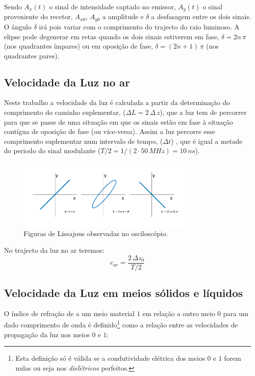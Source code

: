\documentclass[a4paper,12pt]{article}      %
\begin{document}
Sendo $A_x(t)$ o sinal de intensidade captado no emissor,  $A_y(t)$ o sinal
proveniente do recetor, $A_{x0}$, $A_{y0}$ a  amplitude e $\delta$ a desfasagem entre os dois
sinais. O ângulo $\delta$ irá pois variar com o comprimento do trajecto do raio luminoso.  A elipse pode degenerar em retas quando os dois sinais estiverem
em fase, $\delta = 2n\,\pi$ (nos quadrantes ímpares)  ou em oposição de fase, $\delta = (2n+1)\,\pi$ (nos quadrantes pares). 

\subsection{\sf Velocidade da Luz no ar}
Neste trabalho a
velocidade da luz é calculada a partir da determinação do comprimento do
caminho suplementar, ($\Delta L= 2\,\Delta \,z$), que a luz tem de percorrer para que se passe de uma
situação em que os sinais estão em fase à situação contígua de
 oposição de fase (ou vice-versa). Assim a luz percorre esse comprimento suplementar num intervalo de
tempo, ($\Delta t$) ,  que é igual a metade do periodo do sinal modulante ($T/2=1/(2\cdot50\,MHz)= 10\,ns$). 

\begin{figure}
	[htb]  \centering 
	\includegraphics[width=0.8\textwidth]{osci_fase}
	\caption{Figuras de Lissajous observadas no osciloscópio. \label{fig:fase}} 
\end{figure}

No trajecto da luz no ar teremos:
\begin{equation}
	\label{eq:vc}
	c_{ar} = \frac{2\,\Delta z_0}{T/2} 
\end{equation}

\subsection{\sf Velocidade da Luz em meios sólidos e líquidos}
 O índice de refração de a um meio material $1$ em relação a outro meio  $0$
 para um dado comprimento de onda é definido\footnote{Esta definição só é válida se a condutividade elétrica dos meios $0$ e $1$ forem nulas ou seja nos \emph{dielétricos} perfeitos.}
 como a relação entre as velocidades de propagação da luz nos meios $0$ e $1$:
\end{document}
